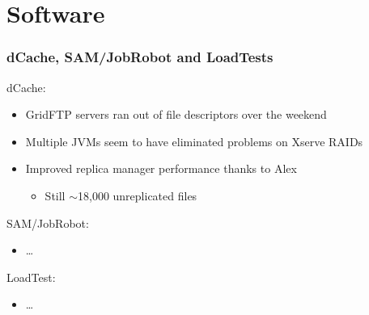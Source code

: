 \documentclass{beamer}
\newcommand{\ca}{\ensuremath{\sim}}
\begin{document}
\section{Software}
\begin{frame}
\frametitle{dCache, SAM/JobRobot and LoadTests}
dCache:
\begin{itemize}
    \item GridFTP servers ran out of file descriptors over the weekend
    \item Multiple JVMs seem to have eliminated problems on Xserve RAIDs\footnotemark{}
    \item Improved replica manager performance thanks to Alex
    \begin{itemize}
        \item Still \ca{}18,000 unreplicated files
    \end{itemize}
\end{itemize}

SAM/JobRobot:
\begin{itemize}
    \item \ldots{}
\end{itemize}

LoadTest:
\begin{itemize}
    \item \ldots{}
\end{itemize}

\end{frame}
\end{document}
